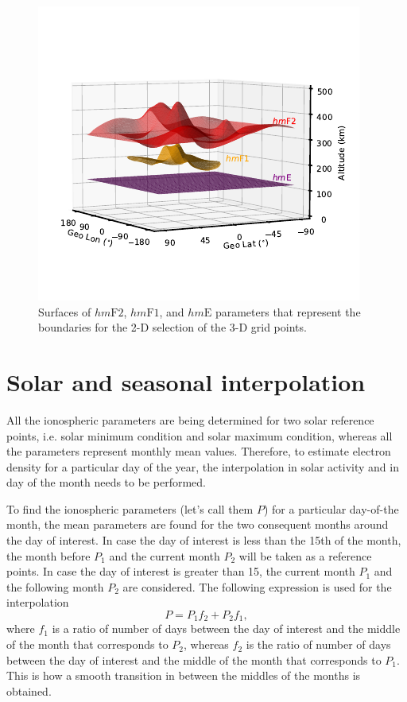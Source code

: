 \documentclass[draft]{agujournal2019}
\begin{document}
\begin{figure}[H]
  \includegraphics[scale=2]{PyIRI_3D_hm_limits.pdf}
  \caption{Surfaces of $hm\mathrm{F2}$, $hm\mathrm{F1}$, and $ hm\mathrm{E}$ parameters that represent the boundaries for the 2-D selection of the 3-D grid points.}
  \label{fig:surface}
\end{figure}
\section{Solar and seasonal interpolation}
All the ionospheric parameters are being determined for two solar reference points, i.e. solar minimum condition and solar maximum condition, whereas all the parameters represent monthly mean values. Therefore, to estimate electron density for a particular day of the year, the interpolation in solar activity and in day of the month needs to be performed. 

To find the ionospheric parameters (let's call them $P$) for a particular day-of-the month, the mean parameters are found for the two consequent months around the day of interest. In case the day of interest is less than the 15th of the month, the month before $P_1$ and the current month $P_2$ will be taken as a reference points. In case the day of interest is greater than 15, the current month $P_1$ and the following month $P_2$ are considered. The following expression is used for the interpolation
\begin{equation}\label{eqn:seson_interpol}
P=P_1f_2+P_2f_1,
\end{equation}
where $f_1$ is a ratio of number of days between the day of interest and the middle of the month that corresponds to $P_2$, whereas $f_2$ is the ratio of number of days between the day of interest and the middle of the month that corresponds to $P_1$. This is how a smooth transition in between the middles of the months is obtained. 
\end{document}
